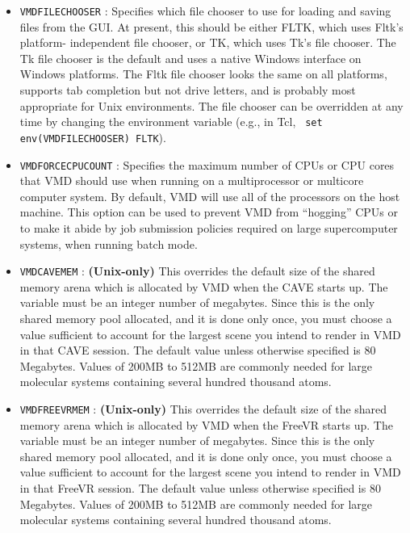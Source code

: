 \begin{itemize}
  \item {\tt VMDFILECHOOSER} :
   Specifies which file chooser to use for loading and saving files from the
   GUI.  At present, this should be either FLTK, which uses Fltk's platform-
   independent file chooser, or TK, which uses Tk's file chooser.  The Tk
   file chooser is the default and uses a native Windows interface on Windows 
   platforms. The Fltk file chooser looks the same on all platforms, supports
   tab completion but not drive letters, and is probably most appropriate for 
   Unix environments.  The file chooser can be overridden at any time by
   changing the environment variable (e.g., in Tcl, {\tt
   set env(VMDFILECHOOSER) FLTK}).  

  \item {\tt VMDFORCECPUCOUNT} :
   Specifies the maximum number of CPUs or CPU cores that VMD should
   use when running on a multiprocessor or multicore computer system.
   By default, VMD will use all of the processors on the host machine.
   This option can be used to prevent VMD from ``hogging'' CPUs or to
   make it abide by job submission policies required on large
   supercomputer systems, when running batch mode.

  \item {\tt VMDCAVEMEM} :
   {\bf (Unix-only)}
   This overrides the default size of the shared memory arena 
   which is allocated by VMD when the CAVE starts up.  The variable
   must be an integer number of megabytes.  Since this is the only 
   shared memory pool allocated, and it is done only once, you must
   choose a value sufficient to account for the largest scene you
   intend to render in VMD in that CAVE session.  The default value
   unless otherwise specified is 80 Megabytes.  Values of 200MB to 512MB
   are commonly needed for large molecular systems containing several
   hundred thousand atoms. 

  \item {\tt VMDFREEVRMEM} :
   {\bf (Unix-only)}
   This overrides the default size of the shared memory arena 
   which is allocated by VMD when the FreeVR starts up.  The variable
   must be an integer number of megabytes.  Since this is the only 
   shared memory pool allocated, and it is done only once, you must
   choose a value sufficient to account for the largest scene you
   intend to render in VMD in that FreeVR session.  The default value
   unless otherwise specified is 80 Megabytes.  Values of 200MB to 512MB
   are commonly needed for large molecular systems containing several
   hundred thousand atoms. 


\end{itemize}
